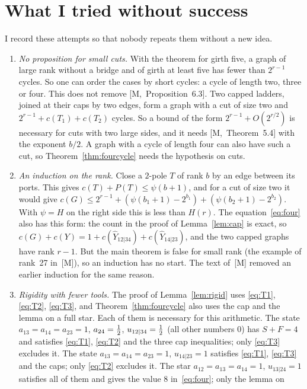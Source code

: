 \documentclass[11pt]{article}
\newcommand{\M}[1]{[M,~#1]}
\begin{document}
\section{What I tried without success}\label{sec:failed}

I record these attempts so that nobody repeats them without a new idea.

\begin{enumerate}[leftmargin=1.6em]
\item \emph{No proposition for small cuts.} With the theorem for girth five, a graph of large rank
without a bridge and of girth at least five has fewer than $2^{r-1}$ cycles. So one can order
the cases by short cycles: a cycle of length two, three or four. This does not remove
\M{Proposition~6.3}. Two capped ladders, joined at their caps by two edges, form a graph with a
cut of size two and $2^{r-1}+c(T_1)+c(T_2)$ cycles. So a bound of the form
$2^{r-1}+O(2^{r/2})$ is necessary for cuts with two large sides, and it needs
\M{Theorem~5.4} with the exponent $b/2$. A graph with a cycle of length four can also have such
a cut, so Theorem~\ref{thm:fourcycle} needs the hypothesis on cuts.
\item \emph{An induction on the rank.} Close a $2$-pole $T$ of rank $b$ by an edge between its
ports. This gives $c(T)+P(T)\le\psi(b+1)$, and for a cut of size two it would give
$c(G)\le2^{r-1}+(\psi(b_1+1)-2^{b_1})+(\psi(b_2+1)-2^{b_2})$. With $\psi=H$ on the right side
this is less than $H(r)$. The equation~\eqref{eq:four} also has this form: the count in the proof
of Lemma~\ref{lem:cap} is exact, so
$c(G)+c(Y)=1+c(\hat Y_{12|34})+c(\hat Y_{14|23})$, and the two capped graphs have rank $r-1$. But
the main theorem is false for small rank (the example of rank~27 in~[M]), so an induction has no
start. The text of~[M] removed an earlier induction for the same reason.
\item \emph{Rigidity with fewer tools.} The proof of Lemma~\ref{lem:rigid} uses
\eqref{eq:T1}, \eqref{eq:T2}, \eqref{eq:T3}, and Theorem~\ref{thm:fourcycle} also uses the cap and
the lemma on a full star. Each of them is necessary for this arithmetic. The state
$a_{13}=a_{14}=a_{23}=1$, $a_{24}=\tfrac12$, $u_{12|34}=\tfrac12$ (all other numbers $0$) has $S+F=4$
and satisfies \eqref{eq:T1}, \eqref{eq:T2} and the three cap inequalities; only \eqref{eq:T3}
excludes it. The state $a_{13}=a_{14}=a_{23}=1$, $u_{14|23}=1$ satisfies \eqref{eq:T1},
\eqref{eq:T3} and the caps; only \eqref{eq:T2} excludes it. The star $a_{12}=a_{13}=a_{14}=1$,
$u_{13|24}=1$ satisfies all of them and gives the value $8$ in~\eqref{eq:four}; only the lemma on

\end{enumerate}
\end{document}
